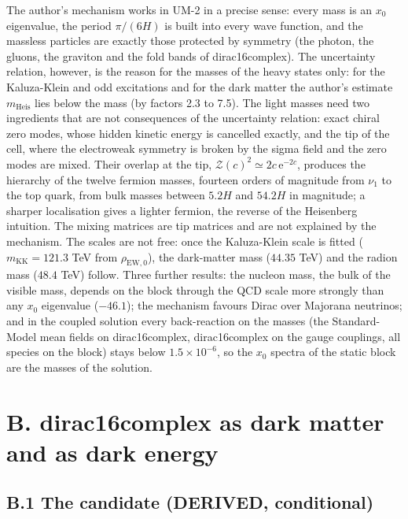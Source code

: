 \documentclass[
  10pt,
]{article}
\begin{document}
The author's mechanism works in UM-2 in a precise sense: every mass is
an \(x_0\) eigenvalue, the period \(\pi/(6H)\) is built into every wave
function, and the massless particles are exactly those protected by
symmetry (the photon, the gluons, the graviton and the fold bands of
dirac16complex). The uncertainty relation, however, is the reason for
the masses of the heavy states only: for the Kaluza-Klein and odd
excitations and for the dark matter the author's estimate
\(m_{\mathrm{Heis}}\) lies below the mass (by factors 2.3 to 7.5). The
light masses need two ingredients that are not consequences of the
uncertainty relation: exact chiral zero modes, whose hidden kinetic
energy is cancelled exactly, and the tip of the cell, where the
electroweak symmetry is broken by the sigma field and the zero modes are
mixed. Their overlap at the tip,
\(\mathcal{Z}(c)^2 \simeq 2c\,\mathrm{e}^{-2c}\), produces the hierarchy
of the twelve fermion masses, fourteen orders of magnitude from
\(\nu_1\) to the top quark, from bulk masses between \(5.2H\) and
\(54.2H\) in magnitude; a sharper localisation gives a lighter fermion,
the reverse of the Heisenberg intuition. The mixing matrices are tip
matrices and are not explained by the mechanism. The scales are not
free: once the Kaluza-Klein scale is fitted (\(m_{\mathrm{KK}} = 121.3\)
TeV from \(\rho_{\mathrm{EW},0}\)), the dark-matter mass (\(44.35\) TeV)
and the radion mass (\(48.4\) TeV) follow. Three further results: the
nucleon mass, the bulk of the visible mass, depends on the block through
the QCD scale more strongly than any \(x_0\) eigenvalue (\(-46.1\)); the
mechanism favours Dirac over Majorana neutrinos; and in the coupled
solution every back-reaction on the masses (the Standard-Model mean
fields on dirac16complex, dirac16complex on the gauge couplings, all
species on the block) stays below \(1.5\times10^{-6}\), so the \(x_0\)
spectra of the static block are the masses of the solution.

\hypertarget{b.-dirac16complex-as-dark-matter-and-as-dark-energy}{%
\section*{B. dirac16complex as dark matter and as dark
energy}\label{b.-dirac16complex-as-dark-matter-and-as-dark-energy}}

\hypertarget{b.1-the-candidate-derived-conditional}{%
\subsection*{B.1 The candidate (DERIVED,
conditional)}\label{b.1-the-candidate-derived-conditional}}
\end{document}
